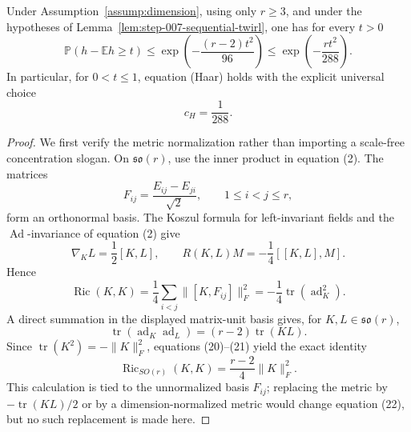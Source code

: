 \begin{proposition}
\label{prop:step-007-product-tail}
Under Assumption~\ref{assump:dimension}, using only \(r\ge3\), and under the
hypotheses of Lemma~\ref{lem:step-007-sequential-twirl}, one has for every
\(t>0\)
\[
  \mathbb P(h-\mathbb Eh\ge t)
  \le \exp\!\left(-\frac{(r-2)t^2}{96}\right)
  \le \exp\!\left(-\frac{rt^2}{288}\right).                \tag{17}
\]
In particular, for \(0<t\le1\), equation (Haar) holds with the explicit
universal choice
\[
  \boxed{c_H=\frac1{288}}.                                  \tag{18}
\]

\end{proposition}

\begin{proof}
We first verify the metric normalization rather
than importing a scale-free concentration slogan. On
\(\mathfrak{so}(r)\), use the inner product in equation (2). The matrices
\[
  F_{ij}=\frac{E_{ij}-E_{ji}}{\sqrt2},
  \qquad 1\le i<j\le r,
\]
form an orthonormal basis. The Koszul formula for left-invariant fields and
the \(\operatorname{Ad}\)-invariance of equation (2) give
\[
  \nabla_KL=\frac12[K,L],
  \qquad
  R(K,L)M=-\frac14[[K,L],M].                                \tag{19}
\]
Hence
\[
  \operatorname{Ric}(K,K)
  =\frac14\sum_{i<j}\|[K,F_{ij}]\|_F^2
  =-\frac14\operatorname{tr}(\operatorname{ad}_K^2).       \tag{20}
\]
A direct summation in the displayed matrix-unit basis gives, for
\(K,L\in\mathfrak{so}(r)\),
\[
  \operatorname{tr}(\operatorname{ad}_K\operatorname{ad}_L)
  =(r-2)\operatorname{tr}(KL).                              \tag{21}
\]
Since \(\operatorname{tr}(K^2)=-\|K\|_F^2\), equations
(20)--(21) yield the exact identity
\[
  \operatorname{Ric}_{SO(r)}(K,K)
  =\frac{r-2}{4}\|K\|_F^2.                                 \tag{22}
\]
This calculation is tied to the unnormalized basis \(F_{ij}\); replacing
the metric by \(-\operatorname{tr}(KL)/2\) or by a dimension-normalized
metric would change equation (22), but no such replacement is made here.


\end{proof}
